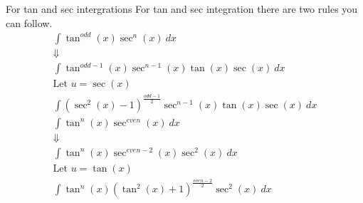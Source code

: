 \documentclass[letterpaper,10pt,twoside,twocolumn,openany]{book}
\begin{document}
\begin{DndSidebar}[]{For tan and sec intergrations}    
    For tan and sec integration there are two rules you can follow.
    \begin{gather*}
        \int \tan^{odd}(x) \sec^n(x)\ dx \\ 
        \Downarrow \\ 
        \int \tan^{odd-1}(x) \sec^{n-1}(x) \tan(x)\sec(x)\ dx\\
        \text{Let $u = \sec(x)$}\\
        \int (\sec^2(x) - 1)^{\frac{odd-1}{2}}\sec^{n-1}(x) \tan(x)\sec(x)\ dx \\
        \int \tan^n(x) \sec^{even}(x)\ dx\\
        \Downarrow\\
        \int \tan^n(x)\sec^{even-2}(x) \sec^2(x)\ dx\\
        \text{Let $u = \tan(x)$}\\
        \int \tan^n(x)(\tan^2(x) + 1)^{\frac{even-2}{2}}\sec^2(x)\ dx
    \end{gather*}
\end{DndSidebar}
\newpage
\end{document}
